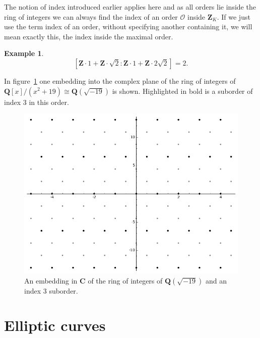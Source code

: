 \documentclass[12pt,a4paper,abstracton,bibtotoc]{scrreprt}
\theoremstyle{definition}
\newtheorem{ex}{Example}
\newcommand{\QQ}{\mathbf{Q}}
\newcommand{\CC}{\mathbf{C}}
\newcommand{\ZZ}{\mathbf{Z}}
\renewcommand{\O}{\mathcal{O}}
\begin{document}
The notion of index introduced earlier applies here and as all orders lie inside the ring of integers we can always find the index of an order $\O$ inside $\ZZ_K$.
If we just use the term index of an order, without specifying another containing it, we will mean exactly this, the index inside the maximal order.

\begin{ex}
\[
[\ZZ\cdot 1 + \ZZ\cdot \sqrt{2} : \ZZ \cdot 1 + \ZZ \cdot 2\sqrt{2}] = 2.
\]
\end{ex}

In figure~\ref{fig:sageord} one embedding into the complex plane of the ring of integers of $\QQ[x]/(x^2 + 19)\cong \QQ(\sqrt{-19})$ is shown.
Highlighted in bold is a suborder of index 3 in this order.
\begin{figure}
\centering
\includegraphics[scale=0.6]{sageord}
\caption{\label{fig:sageord} An embedding in $\CC$ of the ring of integers of $\QQ(\sqrt{-19})$ and an index 3 suborder.}
\end{figure}

%


\section{Elliptic curves}
\label{sec:ell}
\end{document}
